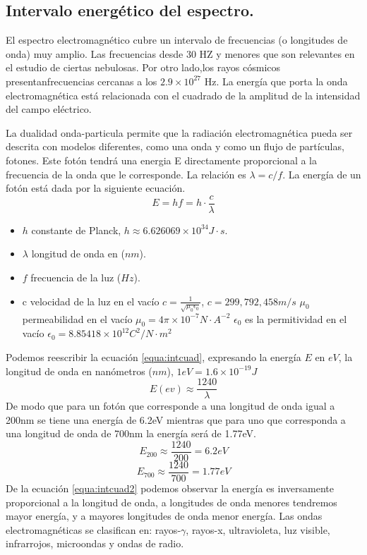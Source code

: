 \subsection{Intervalo energético del espectro.}
El espectro electromagnético cubre un intervalo de frecuencias (o longitudes de onda) muy amplio. Las frecuencias desde 30 HZ y menores que son relevantes en el estudio de ciertas nebulosas. Por otro lado,los rayos cósmicos presentanfrecuencias cercanas a los  $2.9 \times 10^{27}$ Hz.
La energía que porta la onda electromagnética está relacionada con el cuadrado de la amplitud de la intensidad del campo eléctrico. 

La dualidad onda-particula permite que la radiación electromagnética pueda ser descrita con modelos diferentes, como una onda y como un flujo de partículas, fotones. Este fotón tendrá una energia E directamente proporcional a la frecuencia de la onda que le corresponde. La relación es 
$\lambda = c/f$. La energía de un fotón está dada por la siguiente ecuación.
\begin{equation}
E = hf =h\cdot \frac{c}{\lambda}
\label{equa:intcuad}
\end{equation}
\begin{itemize}
	\item $h$ constante de Planck, $h \approx 6.626069\times 10^{34} J\cdot s$.
	\item $\lambda$ longitud de onda en ($nm$).
	\item $f$ frecuencia de la luz ($Hz$).
	\item c velocidad de la luz en el vacío $c = \frac{1}{\sqrt{\mu_0\epsilon_0}}$, $c = 299,792,458 m/s$
	\subitem $\mu_0$ permeabilidad en el vacío $\mu_0 = 4\pi\times10^{-7} N\cdot A^{-2}$
	\subitem $\epsilon_0$ es la permitividad en el vacío $\epsilon_0 = 8.85418\times10^{12} C^2/N\cdot m^2$
	
\end{itemize}
Podemos reescribir la ecuación \ref{equa:intcuad}, expresando la energía $E$ en $eV$, la longitud de onda en nanómetros ($nm$), $1eV = 1.6\times 10^{-19} J$
\begin{equation}
E(ev)\approx \frac{1240}{\lambda}
\label{equa:intcuad2}
\end{equation}
De modo que para un fotón que corresponde a una longitud de onda igual a 200nm se tiene una energía de 6.2eV mientras que para uno que corresponda a una longitud de onda de 700nm la energía será de 1.77eV.
$$E_{200}\approx \frac{1240}{200}=6.2eV $$
$$E_{700}\approx \frac{1240}{700}=1.77eV $$
De la ecuación \ref{equa:intcuad2} podemos observar la energía es inversamente proporcional a la longitud de onda, a longitudes de onda menores tendremos mayor energía, y a mayores longitudes de onda menor energía.
Las ondas electromagnéticas se clasifican en: rayos-$\gamma$, rayos-x, ultravioleta, luz visible, infrarrojos, microondas y ondas de radio.

